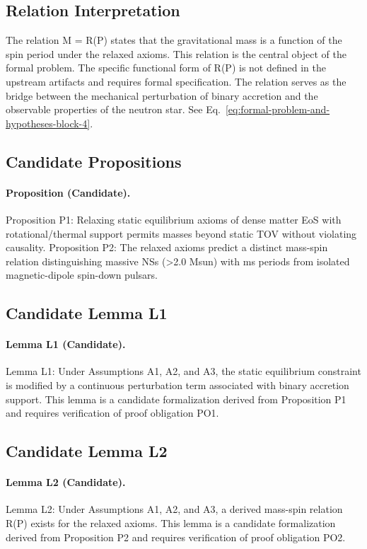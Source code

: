 \documentclass[conference]{IEEEtran}
\begin{document}
\subsection{Relation Interpretation}
The relation M = R(P) states that the gravitational mass is a function of the spin period under the relaxed axioms. This relation is the central object of the formal problem. The specific functional form of R(P) is not defined in the upstream artifacts and requires formal specification. The relation serves as the bridge between the mechanical perturbation of binary accretion and the observable properties of the neutron star. See Eq.~\eqref{eq:formal-problem-and-hypotheses-block-4}.

\subsection{Candidate Propositions}
\paragraph{Proposition (Candidate).} Proposition P1: Relaxing static equilibrium axioms of dense matter EoS with rotational/thermal support permits masses beyond static TOV without violating causality. Proposition P2: The relaxed axioms predict a distinct mass-spin relation distinguishing massive NSs (>2.0 Msun) with ms periods from isolated magnetic-dipole spin-down pulsars.

\subsection{Candidate Lemma L1}
\paragraph{Lemma L1 (Candidate).} Lemma L1: Under Assumptions A1, A2, and A3, the static equilibrium constraint is modified by a continuous perturbation term associated with binary accretion support. This lemma is a candidate formalization derived from Proposition P1 and requires verification of proof obligation PO1.

\subsection{Candidate Lemma L2}
\paragraph{Lemma L2 (Candidate).} Lemma L2: Under Assumptions A1, A2, and A3, a derived mass-spin relation R(P) exists for the relaxed axioms. This lemma is a candidate formalization derived from Proposition P2 and requires verification of proof obligation PO2.
\end{document}
